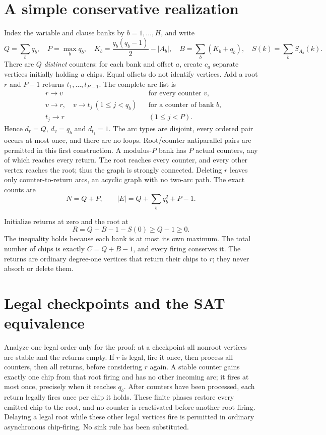 \documentclass[11pt]{article}
\begin{document}
\section{A simple conservative realization}
Index the variable and clause banks by $b=1,\ldots,H$, and write
\[
 Q=\sum_b q_b,\quad P=\max_b q_b,\quad
 K_b=\frac{q_b(q_b-1)}2-|A_b|,\quad
 B=\sum_b(K_b+q_b),\quad S(k)=\sum_b S_{A_b}(k).
\]
There are $Q$ \emph{distinct} counters: for each bank and offset $a$, create
$c_a$ separate vertices initially holding $a$ chips. Equal offsets do not
identify vertices. Add a root $r$ and $P-1$ returns $t_1,\ldots,t_{P-1}$.
The complete arc list is
\begin{align*}
 &r\to v &&\text{for every counter }v,\\
 &v\to r,\quad v\to t_j\ (1\le j<q_b)
       &&\text{for a counter of bank }b,\\
 &t_j\to r &&(1\le j<P).
\end{align*}
Hence $d_r=Q$, $d_v=q_b$ and $d_{t_j}=1$. The arc types are disjoint, every
ordered pair occurs at most once, and there are no loops. Root/counter
antiparallel pairs are permitted in this first construction. A modulus-$P$
bank has $P$ actual counters, any of which reaches every return. The root
reaches every counter, and every other vertex reaches the root; thus the
graph is strongly connected. Deleting $r$ leaves only counter-to-return arcs,
an acyclic graph with no two-arc path. The exact counts are
\begin{equation}\label{counts}
 N=Q+P,\qquad |E|=Q+\sum_b q_b^2+P-1.
\end{equation}

Initialize returns at zero and the root at
\begin{equation}\label{rootmass}
 R=Q+B-1-S(0)\ge Q-1\ge0.
\end{equation}
The inequality holds because each bank is at most its own maximum. The total
number of chips is exactly $C=Q+B-1$, and every firing conserves it.
The returns are ordinary degree-one vertices that return their chips to $r$;
they never absorb or delete them.

\section{Legal checkpoints and the SAT equivalence}
Analyze one legal order only for the proof: at a checkpoint all nonroot
vertices are stable and the returns empty. If $r$ is legal, fire it once,
then process all counters, then all returns, before considering $r$ again.
A stable counter gains exactly one chip from that root firing and has no
other incoming arc; it fires at most once, precisely when it reaches $q_b$.
After counters have been processed, each return legally fires once per chip
it holds. These finite phases restore every emitted chip to the root, and
no counter is reactivated before another root firing. Delaying a legal root
while these other legal vertices fire is permitted in ordinary asynchronous
chip-firing. No sink rule has been substituted.
\end{document}
